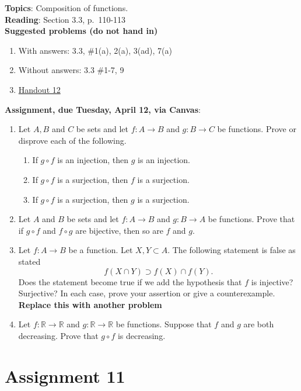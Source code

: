 \documentclass[12pt]{article}
\newcommand{\R}{{\mathbb R}}
\begin{document}
\textbf{Topics}: Composition of functions.
\\

\noindent \textbf{Reading}: Section 3.3, p.~110-113
\\


\noindent \textbf{Suggested problems (do not hand in)}

\begin{enumerate}
\item With answers: 3.3, \#1(a), 2(a), 3(ad), 7(a)
\item Without answers: 3.3 \#1-7, 9
\item \href{https://www.math.emory.edu/~dzb/teaching/250Fall2021/handouts/250-H12-compositions.pdf}{Handout 12}
\end{enumerate}


\noindent \textbf{Assignment, due Tuesday, April 12, via Canvas}:
\begin{enumerate}
\item Let $A, B$ and $C$ be sets and let $f \colon A \to B$ and $g \colon B \to C$ be functions. Prove or disprove each of the following.
 \begin{enumerate}
 \item If $g\circ f$ is an injection, then $g$ is an injection.
 \item If $g\circ f$ is a surjection, then $f$ is a surjection.
 \item If $g\circ f$ is a surjection, then $g$ is a surjection.
 \end{enumerate}
\item Let $A$ and $B$ be sets and let $f \colon A \to B$ and $g \colon B \to A$ be functions. Prove that if $g \circ f$ and $f \circ g$ are bijective, then so are $f$ and $g$.
\item Let $f\colon A \to B$ be a function. Let $X,Y \subset A$. The following statement is false as stated
 $$f(X \cap Y) \supset f(X) \cap f(Y).$$
Does the statement become true if we add the hypothesis that $f$ is injective? Surjective? In each case, prove your assertion or give a counterexample. \textbf{Replace this with another problem}
 \\
 \item Let $f \colon \R \to \R$ and $g \colon \R \to \R$ be functions. Suppose that $f$ and $g$ are both decreasing. Prove that $g \circ f$ is decreasing.
 \end{enumerate}
 
\newpage
\section[11 (due April 19): Inverse functions.]{Assignment 11}
\end{document}
